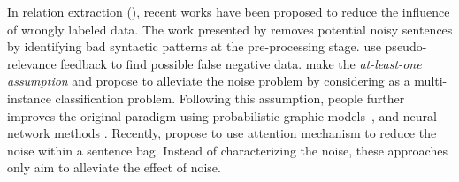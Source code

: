 In relation extraction (\RE), recent works  have been proposed to reduce the influence of wrongly labeled data.
The work presented by \cite{takamatsu2012reducing} removes potential noisy sentences by identifying bad syntactic
patterns at the pre-processing stage. \cite{xu2013filling} use pseudo-relevance feedback to find
possible false negative data.
\cite{riedel2010modeling} make the \emph{at-least-one assumption}
and
propose to alleviate the noise problem by considering \RE  as a multi-instance classification problem.
Following this assumption, people further improves the original paradigm using probabilistic graphic models~\cite{hoffmann2011knowledge,surdeanu2012multi}, and neural network methods \cite{zeng2015distant}.
Recently, \cite{lin2016neural} propose to use attention mechanism to reduce the noise within a sentence bag.
Instead of characterizing the noise, these approaches only aim to alleviate the effect of noise. %
%


